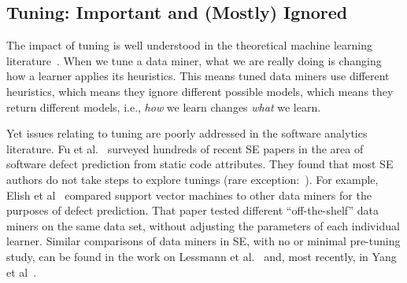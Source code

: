 \documentclass[twocolumn,5p,sort&compress]{elsarticle}
\theoremstyle{break}
\begin{document}



\subsection{Tuning: Important and (Mostly) Ignored}
\label{sect:tune}

The impact of tuning is well understood in the theoretical machine learning literature~\cite{bergstra2012random}.  When we tune a
data miner, what we are really doing is changing how a learner applies its
heuristics. This means tuned data miners use different heuristics, which means
they ignore different possible models, which means they return different models,
i.e., \textit{how} we learn changes \textit{what} we learn.

Yet issues relating to
tuning are poorly addressed in the software analytics literature.  Fu et al.~\cite{fu2016tuning} surveyed hundreds of recent SE papers in the area
of software defect prediction from static code attributes. They found that most SE
  authors do not take steps to explore tunings (rare exception:~\cite{tantithamthavorn2016icse}). For example, Elish et
  al~\cite{elish2008predicting} compared support vector machines to other data
  miners for the purposes of defect prediction. That paper tested different
  ``off-the-shelf'' data miners on the same data set, without adjusting the
  parameters of each individual learner. Similar comparisons of data miners in SE,
with no or minimal pre-tuning study, can be found in the work on Lessmann et al.~\cite{4527256}
and, most recently, in Yang et al~\cite{yang2016effort}.  
\end{document}
